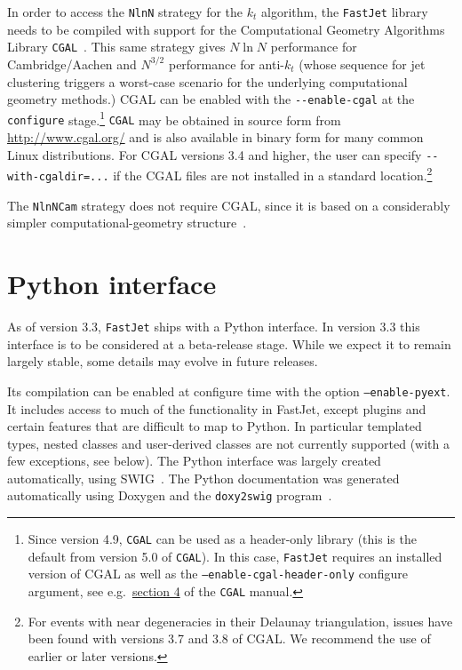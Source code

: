 \documentclass[12pt,a4]{article}
\newcommand{\fastjet}{\texttt{FastJet}\xspace}
\newcommand{\ttt}[1]{{\small\texttt{#1}}}
\begin{document}
In order to access the \ttt{NlnN} strategy for the $k_t$ algorithm,
the \fastjet library needs to be compiled with support for the
Computational Geometry Algorithms Library \ttt{CGAL}~\cite{CGAL}. This
same strategy gives $N\ln N$ performance for Cambridge/Aachen and
$N^{3/2}$ performance for anti-$k_t$ (whose sequence for jet
clustering triggers a worst-case scenario for the underlying
computational geometry methods.)
%
CGAL can be enabled with the \verb|--enable-cgal| at the
\ttt{configure} stage.\footnote{Since version 4.9, \ttt{CGAL} can
  be used as a header-only library (this is the default from version
  5.0 of \ttt{CGAL}). In this case, \fastjet requires an installed
  version of CGAL as well as the \ttt{--enable-cgal-header-only}
  configure argument, see e.g.\ \href{https://doc.cgal.org/latest/Manual/usage.html\#section_headeronly}{section 4} of the \ttt{CGAL} manual.}
%
\ttt{CGAL} may be obtained in source form from
\url{http://www.cgal.org/} and is also available in binary form for
many common Linux distributions.
%
For CGAL versions 3.4 and higher, the user can specify
\verb|--with-cgaldir=...| if the CGAL files are not installed in a
standard location.\footnote{For events with near degeneracies in their
  Delaunay triangulation, issues have been found with versions 3.7 and
  3.8 of CGAL. We recommend the use of earlier or later versions.}

The \ttt{NlnNCam} strategy does not require CGAL, since it is based on
a considerably simpler computational-geometry structure~\cite{Chan}.

\section{Python interface}

As of version 3.3, \fastjet ships with a Python interface.
%
In version 3.3 this interface is to be considered at a beta-release
stage.
%
While we expect it to remain largely stable, some details may evolve
in future releases.

%
Its compilation can be enabled at configure time with the option
\ttt{--enable-pyext}.
%
It includes access to much of the functionality in FastJet, except
plugins and certain features that are difficult to map to Python.
%
In particular templated types, nested classes and user-derived classes
are not currently supported (with a few exceptions, see below).
%
The Python interface was largely created automatically, using
SWIG~\cite{swig}.
%
The Python documentation was generated automatically using Doxygen and
the \ttt{doxy2swig} program~\cite{doxy2swig}.
\end{document}
